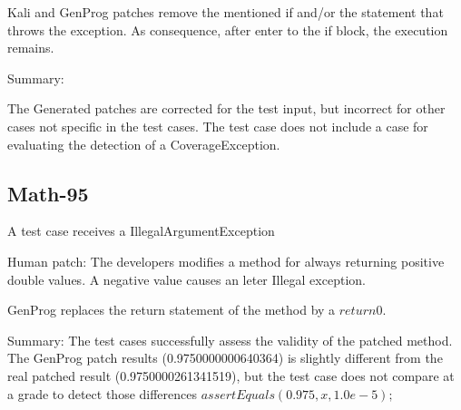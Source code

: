\documentclass{article}
\begin{document}
Kali and GenProg patches remove the mentioned if and/or the statement that throws the exception. As consequence, after enter to the if block, the execution remains. 

Summary:

The Generated patches are corrected for the test input, but incorrect for other cases not specific in the test cases. The test case does not include a case for evaluating the detection of a CoverageException.



\subsection{Math-95}

A test case receives a IllegalArgumentException

Human patch: 
The developers modifies a method for always returning positive double values.
A negative value causes an leter Illegal exception.

GenProg replaces the return statement of the method by a $return 0$.

Summary:
The test cases successfully assess the validity of the patched method.
The GenProg patch results (0.9750000000640364) is slightly different from the real patched result (0.9750000261341519), but the test case does not compare at a grade to detect those differences $assertEquals(0.975, x, 1.0e-5);$
\end{document}
